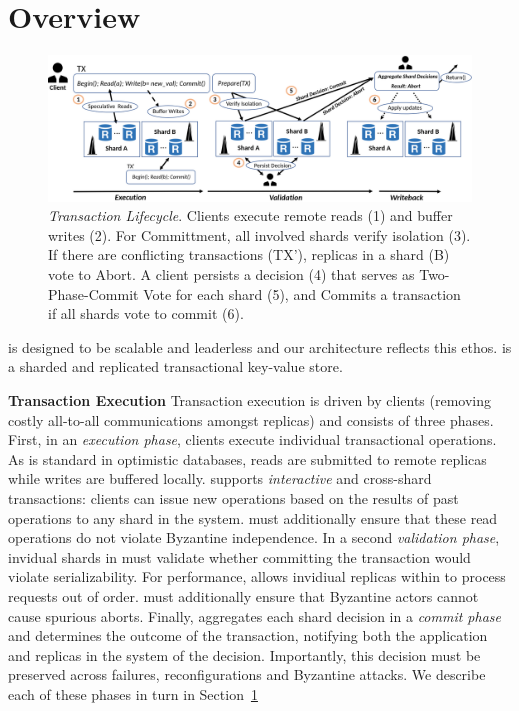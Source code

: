 \section{Overview}
\begin{figure}[!th]
\begin{center}
\includegraphics[width= \textwidth]{./figures/Archi.png}
\end{center}
\caption{{\em Transaction Lifecycle}. Clients execute remote reads (1) and buffer writes (2). For Committment, all involved shards verify isolation (3). If there are conflicting transactions (TX'), replicas in a shard (B) vote to Abort. A client persists a decision (4) that serves as Two-Phase-Commit Vote for each shard (5), and Commits a transaction if all shards vote to commit (6).}
\label{fig:Figure1}
\end{figure}

\sys is designed to be scalable and leaderless and our architecture reflects this ethos. \sys{} is a sharded and replicated transactional key-value store.

\par \textbf{Transaction Execution} Transaction execution is driven by clients (removing costly all-to-all
communications amongst replicas) and consists of three phases. First, in an \textit{execution phase}, clients execute individual transactional operations. As is standard in optimistic
databases, reads are submitted to remote replicas while writes are buffered locally. \sys{} supports \textit{interactive} and cross-shard transactions: clients
can issue new operations based on the results of past operations to any shard in the system. \sys{} must additionally ensure that these read operations do not violate
Byzantine independence. In a second \textit{validation phase}, invidual shards in \sys{} must validate whether committing the transaction would violate serializability. For performance,
\sys{} allows invidiual replicas within to process requests out of order. \sys{} must additionally ensure that Byzantine actors cannot cause spurious aborts. Finally, \sys{} aggregates each shard decision in a \textit{commit phase} and determines the outcome of the transaction, notifying both the application and replicas in the system of the decision. Importantly, this decision must be preserved across failures, reconfigurations and Byzantine attacks. We describe each of these phases in turn in Section~\ref{}

